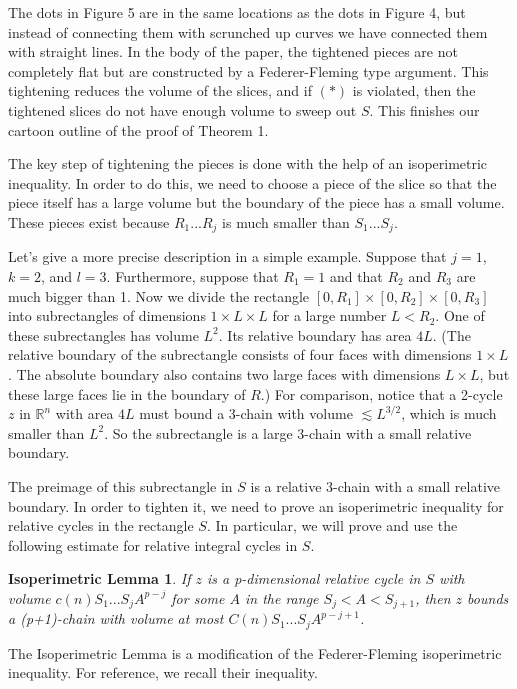 \documentclass{amsart}
\newtheorem*{Theorem 1}{Theorem 1}
\newtheorem*{Theorem 2}{Theorem 2}
\newtheorem*{isolemma}{Isoperimetric Lemma}
\newtheorem*{Estimate 1}{Estimate 1}
\newtheorem*{Estimate 2}{Estimate 2}
\newtheorem*{key lemma}{Key Lemma}
\numberwithin{equation}{section}
\begin{document}
The dots in Figure 5 are in the same locations as the dots in
Figure 4, but instead of connecting them with scrunched up curves
we have connected them with straight lines.  In the body of the
paper, the tightened pieces are not completely flat but are
constructed by a Federer-Fleming type argument.  This tightening
reduces the volume of the slices, and if $(*)$ is violated, then
the tightened slices do not have enough volume to sweep out $S$. 
This finishes our cartoon outline of the proof of Theorem 1.

The key step of tightening the pieces is done with the help of
an isoperimetric inequality.  In order to do this, we need to choose
a piece of the slice so that the piece itself has a large volume
but the boundary of the piece has a small volume.  These pieces
exist because $R_1 ... R_j$ is much smaller than $S_1 ... S_j$.

Let's give a more precise description in a simple example.  Suppose
that $j=1$, $k=2$, and $l=3$.  Furthermore, suppose that $R_1 = 1$
and that $R_2$ and $R_3$ are much bigger than 1.  Now we divide
the rectangle $[0, R_1] \times [0, R_2] \times [0, R_3]$ into
subrectangles of dimensions $1 \times L \times L$ for a large number
$L < R_2$.  One of these subrectangles has volume $L^2$.  Its relative
boundary has area $4L$.  (The relative boundary of the subrectangle
consists of four faces with dimensions $1 \times L$.  The absolute boundary
also contains two large faces with dimensions $L \times L$, but these large
faces lie in the boundary of $R$.)  For comparison, notice that a 2-cycle
$z$ in $\mathbb{R}^n$ with area $4L$ must bound a 3-chain with volume
$\lesssim L^{3/2}$, which is much smaller than $L^2$.  So the
subrectangle is a large 3-chain with a small relative boundary.

The preimage of this subrectangle in $S$ is a relative 3-chain with
a small relative boundary.  In order to tighten it, we need to prove
an isoperimetric inequality for relative cycles in the rectangle $S$.
In particular, we will prove and use the following estimate for relative
integral cycles in $S$.

\begin{isolemma} If $z$ is a p-dimensional relative cycle in
$S$ with volume $c(n) S_1 ... S_j A^{p-j}$ for some $A$ in the range
$S_j < A < S_{j+1}$, then $z$ bounds a (p+1)-chain with volume at
most $C(n) S_1 ... S_j A^{p-j+1}$.
\end{isolemma}

The Isoperimetric Lemma is a modification of the
Federer-Fleming isoperimetric inequality.  For reference, we
recall their inequality.
\end{document}
